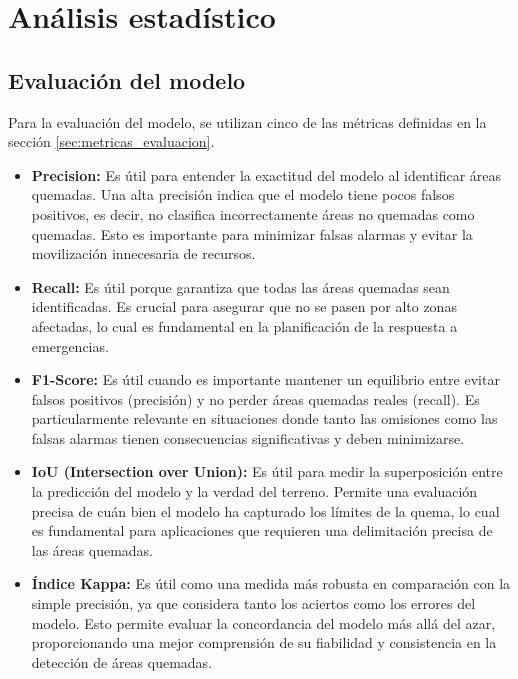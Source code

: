 \section{Análisis estadístico}
\subsection{Evaluación del modelo}
Para la evaluación del modelo, se utilizan cinco de las métricas definidas en la sección \ref{sec:metricas_evaluacion}.

\begin{itemize} 
    \item \textbf{Precision:} Es útil para entender la exactitud del modelo al identificar áreas quemadas. Una alta precisión indica que el modelo tiene pocos falsos positivos, es decir, no clasifica incorrectamente áreas no quemadas como quemadas. Esto es importante para minimizar falsas alarmas y evitar la movilización innecesaria de recursos.
    \item \textbf{Recall:} Es útil porque garantiza que todas las áreas quemadas sean identificadas. Es crucial para asegurar que no se pasen por alto zonas afectadas, lo cual es fundamental en la planificación de la respuesta a emergencias.
    \item \textbf{F1-Score:} Es útil cuando es importante mantener un equilibrio entre evitar falsos positivos (precisión) y no perder áreas quemadas reales (recall). Es particularmente relevante en situaciones donde tanto las omisiones como las falsas alarmas tienen consecuencias significativas y deben minimizarse. 
    \item \textbf{IoU (Intersection over Union):} Es útil para medir la superposición entre la predicción del modelo y la verdad del terreno. Permite una evaluación precisa de cuán bien el modelo ha capturado los límites de la quema, lo cual es fundamental para aplicaciones que requieren una delimitación precisa de las áreas quemadas.    
    \item \textbf{Índice Kappa:} Es útil como una medida más robusta en comparación con la simple precisión, ya que considera tanto los aciertos como los errores del modelo. Esto permite evaluar la concordancia del modelo más allá del azar, proporcionando una mejor comprensión de su fiabilidad y consistencia en la detección de áreas quemadas. 
\end{itemize}